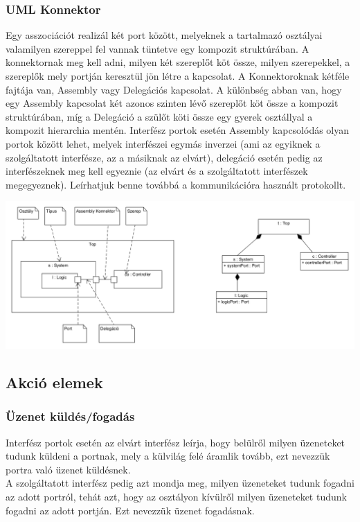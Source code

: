 \documentclass[a4paper,12pt]{report}
\begin{document}
\subsubsection{UML Konnektor}
Egy asszociációt realizál két port között, melyeknek a tartalmazó osztályai valamilyen szereppel fel vannak tüntetve egy kompozit struktúrában. A konnektornak meg kell adni, milyen két szereplőt köt össze, milyen szerepekkel, a szereplők mely portján keresztül jön létre a kapcsolat. A Konnektoroknak kétféle fajtája van, Assembly vagy Delegációs kapcsolat. A különbség abban van, hogy egy Assembly kapcsolat két azonos szinten lévő szereplőt köt össze a kompozit struktúrában, míg a Delegáció a szülőt köti össze egy gyerek osztállyal a kompozit hierarchia mentén. Interfész portok esetén Assembly kapcsolódás olyan portok között lehet, melyek interfészei egymás inverzei (ami az egyiknek a szolgáltatott interfésze, az a másiknak az elvárt), delegáció esetén pedig az interfészeknek meg kell egyeznie (az elvárt és a szolgáltatott interfészek megegyeznek). Leírhatjuk benne továbbá a kommunikációra használt protokollt.

\includegraphics[scale=0.8]{composit_stuct.png}

\subsection{Akció elemek}
\subsubsection{Üzenet küldés/fogadás}
Interfész portok esetén az elvárt interfész leírja, hogy belülről milyen üzeneteket tudunk küldeni a portnak, mely a külvilág felé áramlik tovább, ezt nevezzük portra való üzenet küldésnek. \\ A szolgáltatott interfész pedig azt mondja meg, milyen üzeneteket tudunk fogadni az adott portról, tehát azt, hogy az osztályon kívülről milyen üzeneteket tudunk fogadni az adott portján. Ezt nevezzük üzenet fogadásnak.
\end{document}
